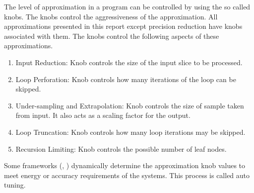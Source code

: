 The level of approximation in a program can be controlled by using the so called knobs. The knobs control the aggressiveness of the approximation. All approximations presented in this report except precision reduction have knobs associated with them. The knobs control the following aspects of these approximations.
\begin{enumerate}
\item Input Reduction: Knob controls the size of the input slice to be processed.
\item Loop Perforation: Knob controls how many iterations of the loop can be skipped.
\item Under-sampling and Extrapolation: Knob controls the size of sample taken from input. It also acts as a scaling factor for the output.
\item Loop Truncation: Knob controls how many loop iterations may be skipped.
\item Recursion Limiting: Knob controls the possible number of leaf nodes.
\end{enumerate}

Some frameworks (\cite{Green}, \cite{Knobs}) dynamically determine the approximation knob values to meet energy or accuracy requirements of the systems. This process is called auto tuning.
